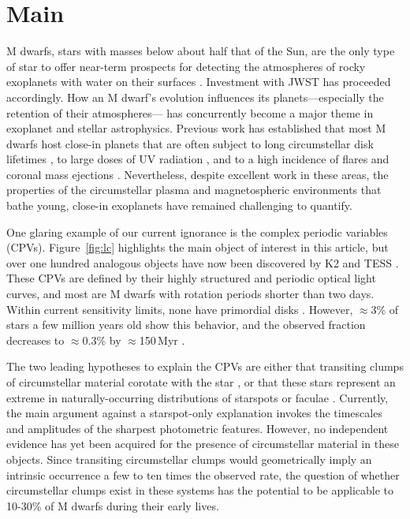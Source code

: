 \documentclass{nature3}
\begin{document}

\section{Main}
\label{sec:main}

M dwarfs, stars with masses below about half that of the Sun, are the
only type of star to offer near-term prospects for detecting the
atmospheres of rocky exoplanets with water on their surfaces
\cite{NAP26141}.  Investment with JWST has proceeded accordingly.  How
an M dwarf's evolution influences its planets---especially the
retention of their atmospheres--- has concurrently become a major
theme in exoplanet and stellar astrophysics.  Previous work has
established that most M dwarfs host close-in planets
\cite{Dressing2015} that are often subject to long
circumstellar disk lifetimes \cite{Ribas2015}, to large doses of UV
radiation \cite{France2013}, and to a high incidence of flares and
coronal mass ejections \cite{Gunther2020}.  Nevertheless, despite excellent
work in these areas, the properties of the circumstellar plasma and
magnetospheric environments that bathe young, close-in exoplanets have
remained challenging to quantify.

One glaring example of our current ignorance is the complex periodic
variables (CPVs).  Figure~\ref{fig:lc} highlights the main object of
interest in this article, but over one hundred analogous objects have
now been discovered by K2 and TESS 
\cite{Rebull2016,Stauffer2017,Rebull2018,Zhan2019,Rebull2020,Bouma2024}.
These CPVs are
defined by their highly structured and periodic optical light curves, 
and most are M dwarfs with rotation periods shorter than two days.
Within current sensitivity limits, none have primordial disks
\cite{Stauffer2017,Bouma2024}.
However, $\approx$3\% of stars a few million years old show this
behavior, and the observed fraction decreases to $\approx$0.3\%
by $\approx$150\,Myr \cite{Rebull2020}.

The two leading hypotheses to explain the CPVs are either that
transiting clumps of circumstellar material corotate with the star
\cite{Stauffer2017,Gunther2022,Bouma2024}, or that these stars
represent an extreme in naturally-occurring distributions of starspots
or faculae \cite{Koen2021}.  Currently, the main argument against a
starspot-only explanation invokes the timescales and amplitudes of the
sharpest photometric features.  However, no independent evidence has
yet been acquired for the presence of circumstellar material in these
objects.  Since transiting circumstellar clumps would geometrically
imply an intrinsic occurrence a few to ten times the observed rate,
the question of whether circumstellar clumps exist in these systems
has the potential to be applicable to 10-30\% of M dwarfs during their
early lives.
\end{document}
